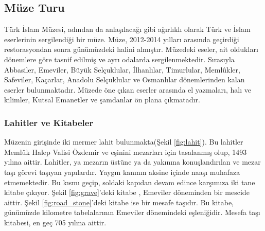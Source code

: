 \subsection{Müze Turu}
\indent\indent Türk İslam Müzesi, adından da anlaşılacağı gibi ağırlıklı olarak Türk ve İslam eserlerinin sergilendiği bir müze. Müze, 2012-2014 yılları arasında geçirdiği restorasyondan sonra günümüzdeki halini almıştır. Müzedeki eseler, ait oldukları dönemlere göre tasnif edilmiş ve ayrı odalarda sergilenmektedir. Sırasıyla Abbasiler, Emeviler, Büyük Selçuklular, İlhanlılar, Timurlular, Memlûkler, Safeviler, Kaçarlar, Anadolu Selçuklular ve Osmanlılar dönemlerinden kalan eserler bulunmaktadır. Müzede öne çıkan eserler arasında el yazmaları, halı ve kilimler, Kutsal Emanetler ve şamdanlar ön plana çıkmatadır.
\subsubsection{Lahitler ve Kitabeler}
\indent\indent Müzenin girişinde iki mermer lahit bulunmakta(Şekil \ref{fig:lahit}). Bu lahitler Memlûk Halep Valisi Özdemir ve eşinini mezarları için tasalanmış olup, 1493 yılına aittir. Lahitler, ya mezarın üstüne ya da yakınına konuşlandırılan ve mezar taşı görevi taşıyan yapılardır. Yaygın kanının aksine içinde naaşı muhafaza etmemektedir.\newline
\indent Bu kısmı geçip, soldaki kapıdan devam edince karşımıza iki tane kitabe çıkıyor. Şekil \ref{fig:grave}'deki kitabe , Emeviler döneminden bir mescide aittir. Şekil \ref{fig:road_stone}'deki kitabe  ise bir mesafe taşıdır. Bu kitabe, günümüzde kilometre tabelalarının Emeviler dönemindeki eşleniğidir. Mesefa taşı kitabesi, en geç 705 yılına aittir.\newpage

